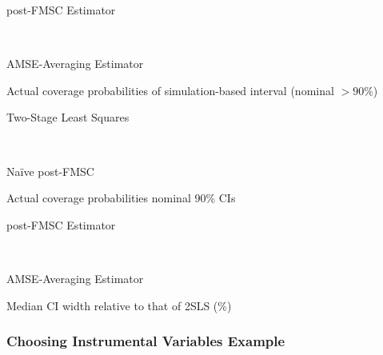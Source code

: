 \begin{table}[h]
\footnotesize
\centering
	\begin{subtable}{0.48\textwidth}
		\caption{post-FMSC Estimator}
		
	\end{subtable}	
	~
	\begin{subtable}{0.48\textwidth}
		\caption{AMSE-Averaging Estimator}
		
	\end{subtable}
	\caption{Actual coverage probabilities of simulation-based interval (nominal $>90\%$)}
\end{table}


\begin{table}[h]
\footnotesize
\centering
	\begin{subtable}{0.48\textwidth}
		\caption{Two-Stage Least Squares}
		
	\end{subtable}	
	~
	\begin{subtable}{0.48\textwidth}
		\caption{Na\"{i}ve post-FMSC}
		
	\end{subtable}
	\caption{Actual coverage probabilities nominal 90\% CIs}
\end{table}


\begin{table}[h]
\footnotesize
\centering
	\begin{subtable}{0.48\textwidth}
		\caption{post-FMSC Estimator}
		
	\end{subtable}	
	~
	\begin{subtable}{0.48\textwidth}
		\caption{AMSE-Averaging Estimator}
		
	\end{subtable}
	\caption{Median CI width relative to that of 2SLS (\%)}
\end{table}


\subsubsection{Choosing Instrumental Variables Example}

